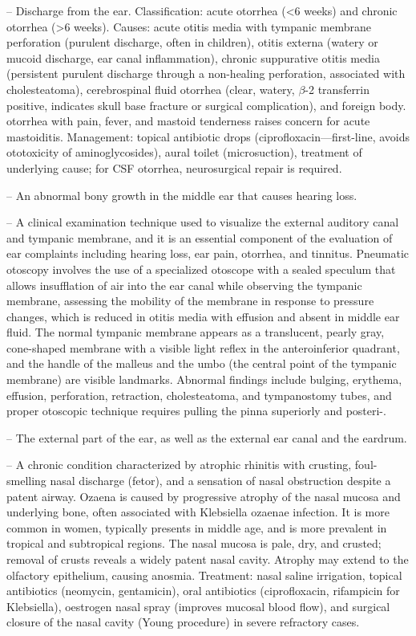 -- Discharge from the ear. Classification: acute otorrhea (<6 weeks) and chronic otorrhea (>6 weeks). Causes: acute otitis media with tympanic membrane perforation (purulent discharge, often in children), otitis externa (watery or mucoid discharge, ear canal inflammation), chronic suppurative otitis media (persistent purulent discharge through a non-healing perforation, associated with cholesteatoma), cerebrospinal fluid otorrhea (clear, watery, \(\beta\)-2 transferrin positive, indicates skull base fracture or surgical complication), and foreign body. otorrhea with pain, fever, and mastoid tenderness raises concern for acute mastoiditis. Management: topical antibiotic drops (ciprofloxacin—first-line, avoids ototoxicity of aminoglycosides), aural toilet (microsuction), treatment of underlying cause; for CSF otorrhea, neurosurgical repair is required.

-- An abnormal bony growth in the middle ear that causes hearing loss.

-- A clinical examination technique used to visualize the external auditory canal and tympanic membrane, and it is an essential component of the evaluation of ear complaints including hearing loss, ear pain, otorrhea, and tinnitus. Pneumatic otoscopy involves the use of a specialized otoscope with a sealed speculum that allows insufflation of air into the ear canal while observing the tympanic membrane, assessing the mobility of the membrane in response to pressure changes, which is reduced in otitis media with effusion and absent in middle ear fluid. The normal tympanic membrane appears as a translucent, pearly gray, cone-shaped membrane with a visible light reflex in the anteroinferior quadrant, and the handle of the malleus and the umbo (the central point of the tympanic membrane) are visible landmarks. Abnormal findings include bulging, erythema, effusion, perforation, retraction, cholesteatoma, and tympanostomy tubes, and proper otoscopic technique requires pulling the pinna superiorly and posteri-.

-- The external part of the ear, as well as the external ear canal and the eardrum.

-- A chronic condition characterized by atrophic rhinitis with crusting, foul-smelling nasal discharge (fetor), and a sensation of nasal obstruction despite a patent airway. Ozaena is caused by progressive atrophy of the nasal mucosa and underlying bone, often associated with Klebsiella ozaenae infection. It is more common in women, typically presents in middle age, and is more prevalent in tropical and subtropical regions. The nasal mucosa is pale, dry, and crusted; removal of crusts reveals a widely patent nasal cavity. Atrophy may extend to the olfactory epithelium, causing anosmia. Treatment: nasal saline irrigation, topical antibiotics (neomycin, gentamicin), oral antibiotics (ciprofloxacin, rifampicin for Klebsiella), oestrogen nasal spray (improves mucosal blood flow), and surgical closure of the nasal cavity (Young procedure) in severe refractory cases.

